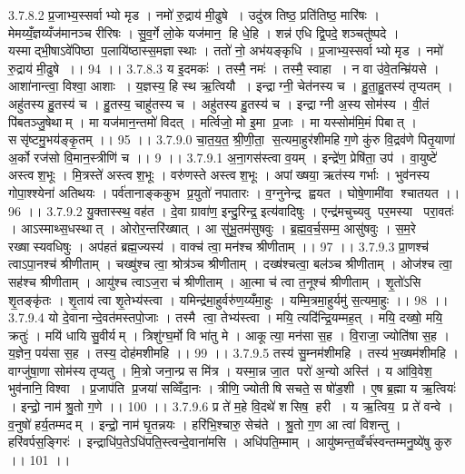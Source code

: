 3.7.8.2
प्र॒जाभ्य॒स्सर्वाभ्यो मृड । नमो॑ रु॒द्राय॑ मी॒ढुषे । उदु॑स्र तिष्ठ॒ प्रति॑तिष्ठ॒ मारि॑षः । मेमय्यँ॒ज्ञय्यँज॑मानञ्च रीरिषः । सु॒व॒र्गे लो॒के यज॑मान॒॒ हि धे॒हि । शन्न॑ एधि द्वि॒पदे॒ शञ्चतु॑ष्पदे । यस्माद्भी॒षाऽवे॑पिष्ठा प॒लायि॑ष्ठास्स॒मज्ञास्थाः । ततो॑ नो॒ अभ॑यङ्कृधि । प्र॒जाभ्य॒स्सर्वाभ्यो मृड । नमो॑ रु॒द्राय॑ मी॒ढुषे ।। 94 ।।
3.7.8.3
य इ॒दमकः॑ । तस्मै॒ नमः॑ । तस्मै॒ स्वाहा । न वा उ॑वे॒तन्म्रि॑यसे । आशा॑नान्त्वा॒ विश्वा॒ आशाः । य॒ज्ञस्य॒ हि स्थ ऋ॒त्वियौ । इन्द्राग्नी॒ चेत॑नस्य च । हु॒ता॒हु॒तस्य॑ तृप्यतम् । अहु॑तस्य हु॒तस्य॑ च । हु॒तस्य॒ चाहु॑तस्य च । अहु॑तस्य हु॒तस्य॑ च । इन्द्राग्नी अ॒स्य सोम॑स्य । वी॒तं पि॑बतञ्जु॒षेथाम् । मा यज॑मान॒न्तमो॑ विदत् । मर्त्विजो॒ मो इ॒मा प्र॒जाः । मा यस्सोम॑मि॒मं पिबात् । ससृ॑ष्टमु॒भय॑ङ्कृ॒तम् ।। 95 ।।
3.7.9.0
चा॒त॒य॒त॒ श्री॒णी॒ता॒॒ स॒त्यमा॒हुर॑शीमहि ग॒णे कु॑रु वि॒द्रव॑णे पितृ॒याणा॑ अ॒र्को रज॑सो वि॒मान॒स्त्रीणि॑ च ।। 9 ।।
3.7.9.1
अ॒ना॒गस॑स्त्वा व॒यम् । इन्द्रे॑ण॒ प्रेषि॑ता॒ उप॑ । वा॒युष्टे॑ अस्त्वश॒भूः । मि॒त्रस्ते॑ अस्त्वश॒भूः । वरु॑णस्ते अस्त्वश॒भूः । अपांख्षया॒ ऋत॑स्य गर्भाः । भुव॑नस्य गोपा॒श्श्येना॑ अतिथयः । पर्व॑तानाङ्ककुभ प्र॒युतो॑ नपातारः । व॒ग्नुनेन्द्र॑ ह्वयत । घोषे॒णामी॑वा श्चातयत ।। 96 ।।
3.7.9.2
यु॒क्तास्स्थ॒ वह॑त । दे॒वा ग्रावा॑ण॒ इन्दु॒रिन्द्र॒ इत्य॑वादिषुः । एन्द्र॑मचुच्यवु पर॒मस्या परा॒वतः॑ । आऽस्माथ्स॒धस्थात् । ओरोर॒न्तरि॑ख्षात् । आ सु॑भू॒तम॑सुषवुः । ब्र॒ह्म॒व॒र्च॒सम्म॒ आसु॑षवुः । स॒म॒रे रख्षा॑स्यवधिषुः । अप॑हतं ब्रह्म॒ज्यस्य॑ । वाक्च॑ त्वा॒ मन॑श्च श्रीणीताम् ।। 97 ।।
3.7.9.3
प्रा॒णश्च॑ त्वाऽपा॒नश्च॑ श्रीणीताम् । चख्षु॑श्च त्वा॒ श्रोत्र॑ञ्च श्रीणीताम् । दख्ष॑श्चत्वा॒ बल॑ञ्च श्रीणीताम् । ओज॑श्च त्वा॒ सह॑श्च श्रीणीताम् । आयु॑श्च त्वाऽज॒रा च॑ श्रीणीताम् । आ॒त्मा च॑ त्वा त॒नूश्च॑ श्रीणीताम् । शृ॒तो॑ऽसि शृ॒तङ्कृ॑तः । शृ॒ताय॑ त्वा शृ॒तेभ्य॑स्त्वा । यमिन्द्र॑मा॒हुर्वरु॑ण॒य्यँमा॒हुः । यम्मि॒त्रमा॒हुर्यमु॑ स॒त्यमा॒हुः ।। 98 ।।
3.7.9.4
यो दे॒वानान्दे॒वत॑मस्तपो॒जाः । तस्मै त्वा॒ तेभ्य॑स्त्वा । मयि॒ त्यदि॑न्द्रि॒यम्मह॒त् । मयि॒ दख्षो॒ मयि॒ क्रतुः॑ । मयि॑ धायि सु॒वीर्यम् । त्रिशु॑ग्घ॒र्मो वि भा॑तु मे । आकूत्या॒ मन॑सा स॒ह । वि॒राजा॒ ज्योति॑षा स॒ह । य॒ज्ञेन॒ पय॑सा स॒ह । तस्य॒ दोह॑मशीमहि ।। 99 ।।
3.7.9.5
तस्य॑ सु॒म्नम॑शीमहि । तस्य॑ भ॒ख्षम॑शीमहि । वाग्जु॑षा॒णा सोम॑स्य तृप्यतु । मि॒त्रो जना॒न्प्र स मि॑त्र । यस्मा॒न्न जा॒त परो॑ अ॒न्यो अस्ति॑ । य आ॑वि॒वेश॒ भुव॑नानि॒ विश्वा । प्र॒जाप॑ति प्र॒जया॑ सव्विँदा॒नः । त्रीणि॒ ज्योती॑षि सचते॒ स षो॑ड॒शी । ए॒ष ब्र॒ह्मा य ऋ॒त्वियः॑ । इन्द्रो॒ नाम॑ श्रु॒तो ग॒णे ।। 100 ।।
3.7.9.6
प्र ते॑ म॒हे वि॒दथे॑ शसिष॒॒ हरी । य ऋ॒त्विय॒ प्र ते॑ वन्वे । व॒नुषो॑ हर्य॒तम्मदम् । इन्द्रो॒ नाम॑ घृ॒तन्नयः । हरि॑भि॒श्चारु॒ सेच॑ते । श्रु॒तो ग॒ण आ त्वा॑ विशन्तु । हरि॑वर्पस॒ङ्गिरः॑ । इन्द्राधि॑प॒तेऽधि॑पति॒स्त्वन्दे॒वाना॑मसि । अधि॑पति॒म्माम् । आयु॑ष्मन्त॒व्वँर्च॑स्वन्तम्मनु॒ष्ये॑षु कुरु ।। 101 ।।
